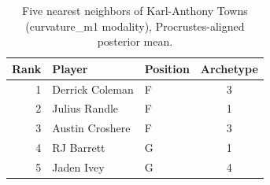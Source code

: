 \begin{table}[htbp]
  \centering\small
  \begin{tabular}{rllc}
    \toprule
    Rank & Player & Position & Archetype \\
    \midrule
    1 & Derrick Coleman & F & 3 \\
    2 & Julius Randle & F & 1 \\
    3 & Austin Croshere & F & 3 \\
    4 & RJ Barrett & G & 1 \\
    5 & Jaden Ivey & G & 4 \\
    \bottomrule
  \end{tabular}
  \caption{Five nearest neighbors of Karl-Anthony Towns (curvature_m1 modality), Procrustes-aligned posterior mean.}
  \label{tab:Karl_Anthony_Towns_neighbors_curvature_m1}
\end{table}

